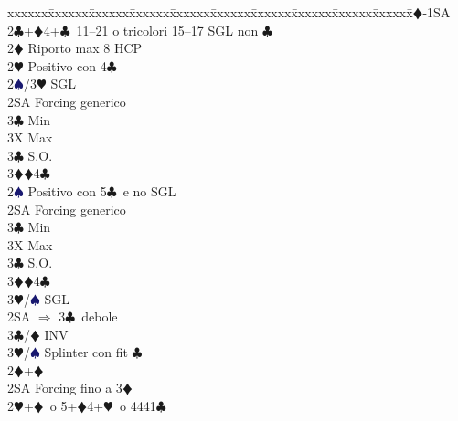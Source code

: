 \documentclass[a4paper,italian]{article}
\newcommand{\BC}{\textcolor{OliveGreen}{$\clubsuit$}}
\newcommand{\BD}{\textcolor{RedOrange}{$\vardiamondsuit$}}
\newcommand{\BH}{\textcolor{Red2}{$\varheartsuit${}}}
\newcommand{\BS}{\textcolor{MidnightBlue}{$\spadesuit${}}}
\newenvironment{bidtable}
{\begin{tabbing}

    xxxxxx\=xxxxxx\=xxxxxx\=xxxxxx\=xxxxxx\=xxxxxx\=xxxxxx\=xxxxxx\=xxxxxx\=xxxxxx\=\kill}
{\end{tabbing} }%
\begin{document}
\begin{multicols}{2}
                                        \begin{bidtable}
                                            1\BD-1SA\+\\
                                            2\BC {}+\BD 4+\BC\ 11--21 o tricolori 15--17 SGL non \BC \+\\
                                            2\BD \> Riporto max 8 HCP\\
                                            2\BH \> Positivo con 4\BC \+\\
                                            2\BS/3\BH \> SGL\\
                                            2SA \> Forcing generico\+\\
                                            3\BC \> Min\\
                                            3X \> Max\-\\
                                            3\BC \> S.O.\\
                                            3\BD {}\BD 4\BC \-\\
                                            2\BS \> Positivo con 5\BC\ e no SGL\+\\
                                            2SA \> Forcing generico\+\\
                                            3\BC \> Min\\
                                            3X \> Max\-\\
                                            3\BC \> S.O.\\
                                            3\BD {}\BD 4\BC \\
                                            3\BH/\BS \> SGL\-\\
                                            2SA \> $\Rightarrow$ 3\BC\ debole\\
                                            3\BC/\BD \> INV\\
                                            3\BH/\BS \> Splinter con fit \BC \-\\
                                            2\BD {}+\BD \+\\
                                            2SA \> Forcing fino a 3\BD \-\\
                                            2\BH {}+\BD\ o 5+\BD 4+\BH\ o 4441\BC \+\\

\end{bidtable}
\end{multicols}
\end{document}
